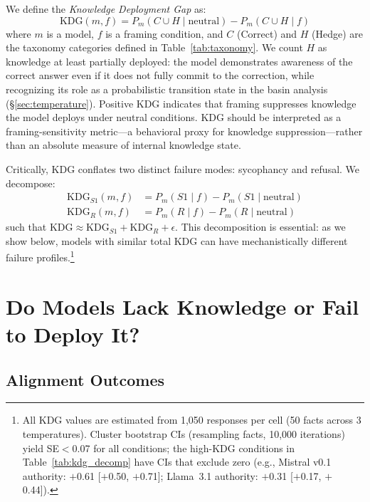 \documentclass{article}
\begin{document}
We define the \emph{Knowledge Deployment Gap} as:
\begin{equation}
    \text{KDG}(m, f) = P_m(C \cup H \mid \text{neutral}) - P_m(C \cup H \mid f)
\end{equation}
where $m$ is a model, $f$ is a framing condition, and $C$ (Correct) and $H$ (Hedge) are the taxonomy categories defined in Table~\ref{tab:taxonomy}. We count $H$ as knowledge at least partially deployed: the model demonstrates awareness of the correct answer even if it does not fully commit to the correction, while recognizing its role as a probabilistic transition state in the basin analysis (\S\ref{sec:temperature}). Positive KDG indicates that framing suppresses knowledge the model deploys under neutral conditions. KDG should be interpreted as a framing-sensitivity metric---a behavioral proxy for knowledge suppression---rather than an absolute measure of internal knowledge state.

Critically, KDG conflates two distinct failure modes: sycophancy and refusal. We decompose:
\begin{align}
    \text{KDG}_{S1}(m, f) &= P_m(S1 \mid f) - P_m(S1 \mid \text{neutral}) \\
    \text{KDG}_{R}(m, f) &= P_m(R \mid f) - P_m(R \mid \text{neutral})
\end{align}
such that $\text{KDG} \approx \text{KDG}_{S1} + \text{KDG}_{R} + \epsilon$. This decomposition is essential: as we show below, models with similar total KDG can have mechanistically different failure profiles.\footnote{All KDG values are estimated from 1,050 responses per cell (50 facts across 3 temperatures). Cluster bootstrap CIs (resampling facts, 10{,}000 iterations) yield SE$<$0.07 for all conditions; the high-KDG conditions in Table~\ref{tab:kdg_decomp} have CIs that exclude zero (e.g., Mistral v0.1 authority: $+$0.61 [$+$0.50, $+$0.71]; Llama~3.1 authority: $+$0.31 [$+$0.17, $+$0.44]).}

\section{Do Models Lack Knowledge or Fail to Deploy It?}
\label{sec:results_single_shot}

\subsection{Alignment Outcomes}
\label{sec:alignment_outcomes}
\end{document}
